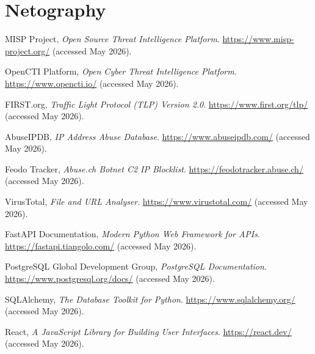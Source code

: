 \documentclass[12pt,a4paper,oneside]{book}
\begin{document}
{{\begin{appendix}
\end{appendix}

\chapter*{Netography}

\begin{enumerate}[label={[\arabic*]}]

\item MISP Project, \textit{Open Source Threat Intelligence Platform}.
\url{https://www.misp-project.org/} (accessed May 2026).

\item OpenCTI Platform, \textit{Open Cyber Threat Intelligence Platform}.
\url{https://www.opencti.io/} (accessed May 2026).

\item FIRST.org, \textit{Traffic Light Protocol (TLP) Version 2.0}.
\url{https://www.first.org/tlp/} (accessed May 2026).

\item AbuseIPDB, \textit{IP Address Abuse Database}.
\url{https://www.abuseipdb.com/} (accessed May 2026).

\item Feodo Tracker, \textit{Abuse.ch Botnet C2 IP Blocklist}.
\url{https://feodotracker.abuse.ch/} (accessed May 2026).

\item VirusTotal, \textit{File and URL Analyser}.
\url{https://www.virustotal.com/} (accessed May 2026).

\item FastAPI Documentation, \textit{Modern Python Web Framework for APIs}.
\url{https://fastapi.tiangolo.com/} (accessed May 2026).

\item PostgreSQL Global Development Group, \textit{PostgreSQL Documentation}.
\url{https://www.postgresql.org/docs/} (accessed May 2026).

\item SQLAlchemy, \textit{The Database Toolkit for Python}.
\url{https://www.sqlalchemy.org/} (accessed May 2026).

\item React, \textit{A JavaScript Library for Building User Interfaces}.
\url{https://react.dev/} (accessed May 2026).


\end{enumerate}}}
\end{document}
